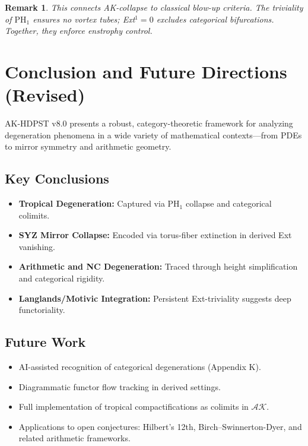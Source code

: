 \documentclass[11pt]{article}
\newtheorem{remark}[theorem]{Remark}
\begin{document}
\begin{remark}
This connects AK-collapse to classical blow-up criteria. The triviality of $\mathrm{PH}_1$ ensures no vortex tubes; Ext$^1 = 0$ excludes categorical bifurcations. Together, they enforce enstrophy control.
\end{remark}




\section{Conclusion and Future Directions (Revised)}

AK-HDPST v8.0 presents a robust, category-theoretic framework for analyzing degeneration phenomena in a wide variety of mathematical contexts—from PDEs to mirror symmetry and arithmetic geometry.

\subsection*{Key Conclusions}
\begin{itemize}
    \item \textbf{Tropical Degeneration:} Captured via PH\(_1\) collapse and categorical colimits.
    \item \textbf{SYZ Mirror Collapse:} Encoded via torus-fiber extinction in derived Ext vanishing.
    \item \textbf{Arithmetic and NC Degeneration:} Traced through height simplification and categorical rigidity.
    \item \textbf{Langlands/Motivic Integration:} Persistent Ext-triviality suggests deep functoriality.
\end{itemize}

\subsection*{Future Work}
\begin{itemize}
    \item AI-assisted recognition of categorical degenerations (Appendix K).
    \item Diagrammatic functor flow tracking in derived settings.
    \item Full implementation of tropical compactifications as colimits in \( \mathcal{AK} \).
    \item Applications to open conjectures: Hilbert’s 12th, Birch–Swinnerton-Dyer, and related arithmetic frameworks.
\end{itemize}
\end{document}
